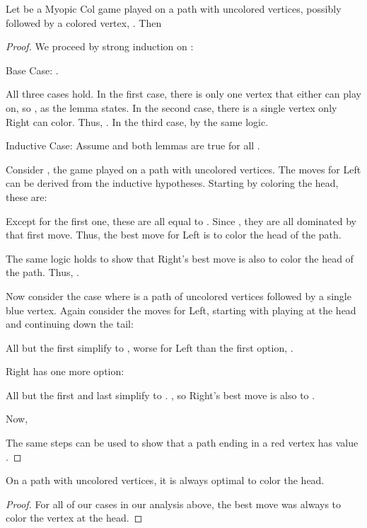 \documentclass[letter,10pt]{article}
\begin{document}
\begin{lemma}\label{lem:pathMyopicColValues}
  Let  be a Myopic Col game played on a path with  uncolored vertices, possibly followed by a colored vertex, .  Then 
  
\end{lemma}

\begin{proof}

  We proceed by strong induction on :
  
  Base Case: .
  
  All three cases hold.  In the first case, there is only one vertex that either can play on, so , as the lemma states.  In the second case, there is a single vertex only Right can color.  Thus, .  In the third case,  by the same logic.
  
  Inductive Case: Assume  and both lemmas are true for all .
  
  Consider , the game played on a path with  uncolored vertices.  The moves for Left can be derived from the inductive hypotheses.  Starting by coloring the head, these are: 
  
  Except for the first one, these are all equal to .  Since , they are all dominated by that first move.  Thus, the best move for Left is to color the head of the path.
  
  The same logic holds to show that Right's best move is also to color the head of the path.  Thus, .
  
  Now consider the case where  is a path of  uncolored vertices followed by a single blue vertex.  Again consider the moves for Left, starting with playing at the head and continuing down the tail: 
  
  All but the first simplify to , worse for Left than the first option, .
  
  Right has one more option: 
    
    All but the first and last simplify to .  , so Right's best move is also to .
  
  Now, 
  
  The same steps can be used to show that a path ending in a red vertex has value .
\end{proof}

\begin{corollary}
  On a path with  uncolored vertices, it is always optimal to color the head.
\end{corollary}
\begin{proof}
  For all of our cases in our analysis above, the best move was always to color the vertex at the head.
\end{proof}
\end{document}
